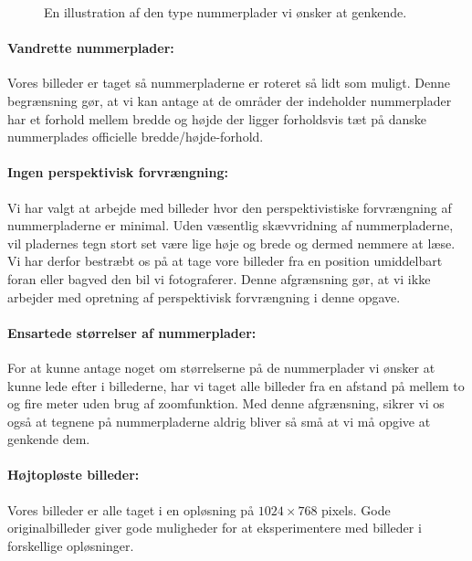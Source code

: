 \begin{figure}[htp]
\centering
{} 
\caption{En illustration af den type nummerplader vi ønsker at genkende.}
\label{fig:typisk_nummerplade}
\end{figure}

\paragraph{Vandrette nummerplader:}
Vores billeder er taget så nummerpladerne er roteret så lidt som muligt. Denne begrænsning gør, at vi kan antage at de områder der indeholder nummerplader har et forhold mellem bredde og højde der ligger forholdsvis tæt på danske nummerplades officielle bredde/højde-forhold.

\paragraph{Ingen perspektivisk forvrængning:}
Vi har valgt at arbejde med billeder hvor den perspektivistiske forvrængning af nummerpladerne er minimal. Uden væsentlig skævvridning af nummerpladerne, vil pladernes tegn stort set være lige høje og brede og dermed nemmere at læse. Vi har derfor bestræbt os på at tage vore billeder fra en position umiddelbart foran eller bagved den bil vi fotograferer. Denne afgrænsning gør, at vi ikke arbejder med opretning af perspektivisk forvrængning i denne opgave.

\paragraph{Ensartede størrelser af nummerplader:}
For at kunne antage noget om størrelserne på de nummerplader vi ønsker at kunne lede efter i billederne, har vi taget alle billeder fra en afstand på mellem to og fire meter uden brug af zoomfunktion. Med denne afgrænsning, sikrer vi os også at tegnene på nummerpladerne aldrig bliver så små at vi må opgive at genkende dem.

\paragraph{Højtopløste billeder:}
Vores billeder er alle taget i en opløsning på $1024 \times 768$ pixels. Gode originalbilleder giver gode muligheder for at eksperimentere med billeder i forskellige opløsninger. 


